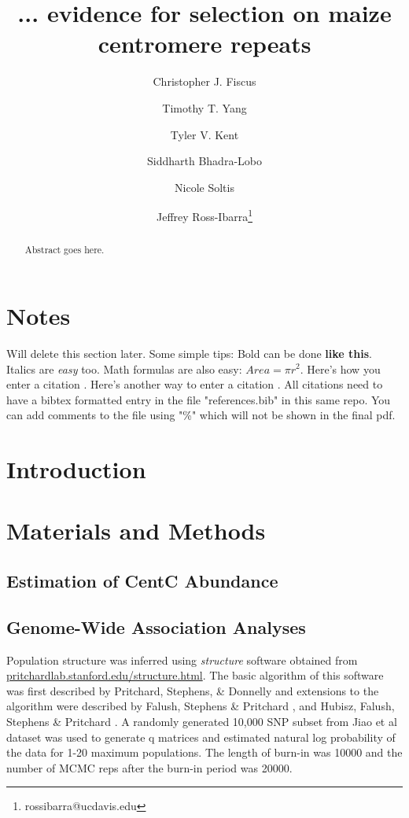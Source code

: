 \documentclass[12pt]{article}
\title{... evidence for selection on maize centromere repeats}
\author[1]{Christopher J. Fiscus}
\author[1]{Timothy T. Yang}
\author[1]{Tyler V. Kent}
\author[1]{Siddharth Bhadra-Lobo}
\author[1]{Nicole Soltis}
\author[1,2]{Jeffrey Ross-Ibarra\thanks{rossibarra@ucdavis.edu}}
\affil[1]{Department of Plant Sciences, University of California Davis}
\affil[2]{Center for Population Biology and Genome Center, University of California Davis}
\date{}
\begin{document}
\maketitle

\begin{abstract}
Abstract goes here.
\end{abstract}

\begin{footnotesize}
\end{footnotesize}

\section*{Notes}

Will delete this section later.  Some simple tips:
Bold can be done {\bf like this}.  Italics are \emph{easy} too.  Math formulas are also easy: $Area=\pi r^2$.
Here's how you enter a citation \cite{Wolfgruber2009}.
Here's another way to enter a citation \citep{Wolfgruber2009}.
All citations need to have a bibtex formatted entry in the file "references.bib" in this same repo. You can add comments to the file using "\%" which will not be shown in the final pdf.  

\section{Introduction}

\section{Materials and Methods}

\subsection{Estimation of CentC Abundance} %

\subsection{Genome-Wide Association Analyses} %
Population structure was inferred using \emph{structure} software obtained from \url{pritchardlab.stanford.edu/structure.html}.  The basic algorithm of this software was first described by Pritchard, Stephens, \& Donnelly \cite{Pritchard2000} and extensions to the algorithm were described by Falush, Stephens \& Pritchard \cite{Falush2003}, \cite{Falush2007} and Hubisz, Falush, Stephens \& Pritchard \cite{Hubisz2009}. A randomly generated 10,000 SNP subset from Jiao et al dataset was used to generate q matrices and estimated natural log probability of the data for 1-20 maximum populations.  The length of burn-in was 10000 and the number of MCMC reps after the burn-in period was 20000.  
\end{document}
